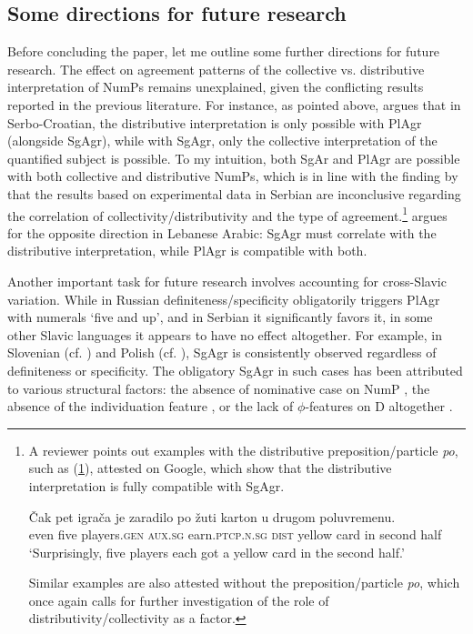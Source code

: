 \documentclass[output=paper,colorlinks,citecolor=brown
]{langscibook}
\begin{document}
\subsection{Some directions for future research} \label{subsect:future}
Before concluding the paper, let me outline some further directions for future research.
The effect on agreement patterns of the collective vs. distributive interpretation of NumPs remains unexplained, given the conflicting results reported in the previous literature. For instance, as pointed above, \citet{Culinovic2017} argues that in Serbo-Croatian, the distributive interpretation is only possible with PlAgr (alongside SgAgr), while with SgAgr, only the collective interpretation of the quantified subject is possible. To my intuition, both SgAr and PlAgr are possible with both collective and distributive NumPs, which is in line with the finding by \citet{Bosnic2016} that the results based on experimental data in Serbian are inconclusive regarding the correlation of collectivity/distributivity and the type of agreement.\footnote{A reviewer points out examples with the distributive preposition/particle \textit{po}, such as (\ref{ex-non-def-sg}), attested on Google, which show that the distributive interpretation is fully compatible with SgAgr.

\ea \label{ex-non-def-sg}
\gll Čak pet igrača je zaradilo po žuti karton u drugom poluvremenu. \\
even five players.\textsc{gen} \textsc{aux.sg} earn.\textsc{ptcp.n.sg} \textsc{dist} yellow card in second half \\
\glt `Surprisingly, five players each got a yellow card in the second half.'
\z

\noindent Similar examples are also attested without the preposition/particle \textit{po}, which once again calls for further investigation of the role of distributivity/collectivity as a factor.} \citet{Ouwayda2014, Ouwayda2017} argues for the opposite direction in Lebanese Arabic: SgAgr must correlate with the distributive interpretation, while PlAgr is compatible with both.

Another important task for future research involves accounting for cross-Slavic variation. While in Russian definiteness/specificity obligatorily triggers PlAgr with numerals `five and up', and in Serbian it significantly favors it, in some other Slavic languages it appears to have no effect altogether. For example, in Slovenian (cf. \citealt{Marusic2009,Marusic2015}) and Polish (cf. \citealt{Witkos2016, Witkos2016a, Matushansky2018}), SgAgr is consistently observed regardless of definiteness or specificity.
The obligatory SgAgr in such cases has been attributed to various structural factors: the absence of nominative case on NumP \citep{Witkos2016, Witkos2016a}, the absence of the individuation feature \citep{Matushansky2018}, or the lack of $\phi$-features on D altogether \citep{Marusic2015}.
\end{document}

